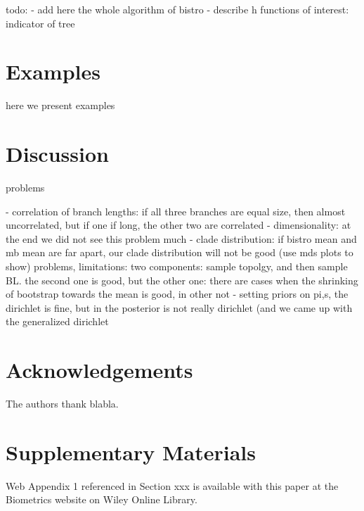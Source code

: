 \documentclass[useAMS,usenatbib]{biom}
\begin{document}
todo:
- add here the whole algorithm of bistro
- describe h functions of interest: indicator of tree


\section{Examples}
\label{examples}
here we present examples

\section{Discussion}
\label{discussion}
problems

- correlation of branch lengths: if all three branches are equal size,
then almost uncorrelated, but if one if long, the other two are correlated
- dimensionality: at the end we did not see this problem much
- clade distribution: if bistro mean and mb mean are far apart, our
clade distribution will not be good (use mds plots to show)
problems, limitations: two components: sample topolgy, and then
sample BL. the second one is good, but the other one: there are
cases when the shrinking of bootstrap towards the mean is good, in
other not 
- setting priors on pi,s, the dirichlet is fine, but in
the posterior is not really dirichlet (and we came up with the
generalized dirichlet

\backmatter


\section*{Acknowledgements}

The authors thank blabla.\vspace*{-8pt}


\section*{Supplementary Materials}

Web Appendix 1 referenced in Section xxx is available
with this paper at the Biometrics website on Wiley Online Library.
\vspace*{-8pt}


 
\end{document}
